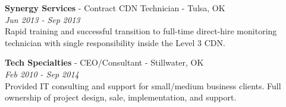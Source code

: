 \documentclass[10pt]{article} %
\begin{document}

{
\textbf{Synergy Services} - Contract CDN Technician - Tulsa, OK\\
\textit{Jun 2013 - Sep 2013}\\ 
Rapid training and successful transition to full-time direct-hire monitoring technician with single responsibility inside the Level 3 CDN.

\textbf{Tech Specialties} - CEO/Consultant - Stillwater, OK\\
\textit{Feb 2010 - Sep 2014}\\ 
Provided IT consulting and support for small/medium business clients. Full ownership of project design, sale, implementation, and support.

}
\end{document}
